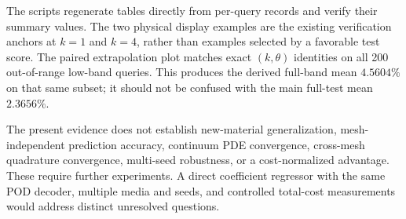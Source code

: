 \documentclass{article}
\begin{document}
The scripts regenerate tables directly from per-query records and verify their summary values. The two physical display examples are the existing verification anchors at $k=1$ and $k=4$, rather than examples selected by a favorable test score. The paired extrapolation plot matches exact $(k,\theta)$ identities on all 200 out-of-range low-band queries. This produces the derived full-band mean $4.5604\%$ on that same subset; it should not be confused with the main full-test mean $2.3656\%$.

The present evidence does not establish new-material generalization, mesh-independent prediction accuracy, continuum PDE convergence, cross-mesh quadrature convergence, multi-seed robustness, or a cost-normalized advantage. These require further experiments. A direct coefficient regressor with the same POD decoder, multiple media and seeds, and controlled total-cost measurements would address distinct unresolved questions.
\end{document}
